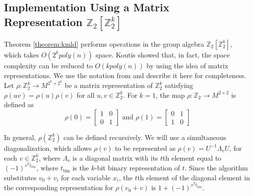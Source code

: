 

\subsection{Implementation Using a Matrix Representation $\mathbb{Z}_2[\mathbb{Z}_2^k]$}
Theorem \ref{theorem:kmld} performs operations in the group algebra $\mathbb{Z}_2[\mathbb{Z}_2^k]$,
which takes $O(2^k poly(n))$ space. Koutis \cite{koutis:icalp08} showed that, in fact, the space
complexity can be reduced to $O(k poly(n))$ by using the idea of matrix representations.
We use the notation from \cite{koutis:icalp08} and describe it here for completeness.
Let $\rho:\mathbb{Z}_2^k\rightarrow M^{2^k\times 2^k}$ be a matrix representation of
$\mathbb{Z}_2^k$ satisfying $\rho(uv)=\rho(u)\rho(v)$ for all $u, v\in \mathbb{Z}_2^k$.
For $k=1$, the map $\rho:\mathbb{Z}_2\rightarrow M^{2\times 2}$ is defined as
\[
\rho(0) = 
\begin{bmatrix}
1 & 0\\
0 & 1
\end{bmatrix}
\mbox{ and }
\rho(1) = 
\begin{bmatrix}
0 & 1\\
1 & 0
\end{bmatrix}
\]

In general, $\rho(\mathbb{Z}_2^k)$ can be defined recursively. We will use a
simultaneous diagonalization, which allows $\rho(v)$ to be represented as
$\rho(v) = U^{-1}\Lambda_v U$, for each $v\in \mathbb{Z}_2^k$, where $\Lambda_v$ is
a diagonal matrix with its $t$th element equal to $(-1)^{v^T t_{bin}}$,
where $t_{\text{bin}}$ is the $k$-bit binary representation of $t$.
Since the algorithm substitutes $v_0+v_i$ for each variable $x_i$, the $t$th element of the diagonal element in the corresponding
representation for $\rho(v_0+v)$ is $1+(-1)^{v^T t_{bin}}$.

